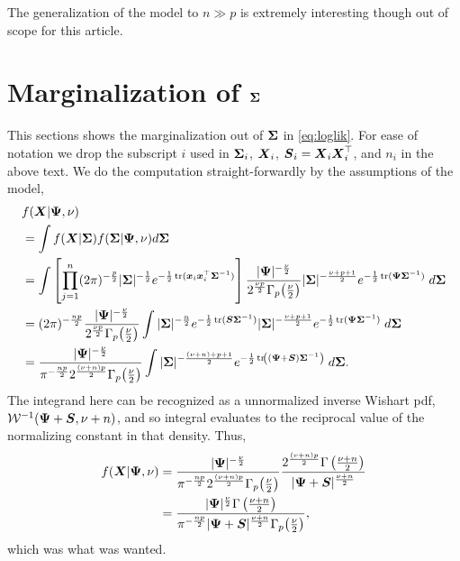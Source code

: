 \documentclass{article}\usepackage[]{graphicx}\usepackage[]{color}
\begin{document}
The generalization of the model to $n \gg p$ is extremely interesting though out of scope for this article.



\newpage




\newpage
\appendix

\section[Marginalization of Sigma]{Marginalization of ${\boldsymbol{\Sigma}}$}
\label{sec:marginalization}
This sections shows the marginalization out of ${\boldsymbol{\Sigma}}$ in \eqref{eq:loglik}. For ease of notation we drop the subscript $i$ used in ${\boldsymbol{\Sigma}}_i$, ${\boldsymbol{X}}_i$, ${\boldsymbol{S}}_i = {\boldsymbol{X}}_i {\boldsymbol{X}}_i^\top$, and $n_i$ in the above text. We do the computation straight-forwardly by the assumptions of the model,
\small
\begin{align*}
  &f({\boldsymbol{X}} | {\boldsymbol{\Psi}}, \nu) \\
  &= \int f({\boldsymbol{X}}|{\boldsymbol{\Sigma}}) f({\boldsymbol{\Sigma}} | {\boldsymbol{\Psi}}, \nu) d{\boldsymbol{\Sigma}} \\
  &= \int \left[ \prod_{j = 1}^n  (2\pi)^{-\frac{p}{2}} |{\boldsymbol{\Sigma}}|^{-\frac{1}{2}}
                         e^{-\frac{1}{2}\operatorname*{tr}({\boldsymbol{x}}_i{\boldsymbol{x}}_i^\top{\boldsymbol{\Sigma}}^{-1})} \right]
          \frac{|{\boldsymbol{\Psi}}|^{-\frac{\nu}{2}}}{2^{\frac{\nu p}{2}}\Gamma_p\!\left(\frac{\nu}{2}\right)}
          |{\boldsymbol{\Sigma}}|^{-\frac{\nu+p+1}{2}}e^{-\frac{1}{2}\operatorname*{tr}({\boldsymbol{\Psi}}{\boldsymbol{\Sigma}}^{-1})}
      \;d{\boldsymbol{\Sigma}} \\
  &= (2\pi)^{-\frac{np}{2}}
      \frac{|{\boldsymbol{\Psi}}|^{-\frac{\nu}{2}}}{2^{\frac{\nu p}{2}}\Gamma_p\!\left(\frac{\nu}{2}\right)}
      \int
        |{\boldsymbol{\Sigma}}|^{-\frac{n}{2}}  e^{-\frac{1}{2}\operatorname*{tr}({\boldsymbol{S}}{\boldsymbol{\Sigma}}^{-1})}
        |{\boldsymbol{\Sigma}}|^{-\frac{\nu+p+1}{2}} e^{-\frac{1}{2}\operatorname*{tr}({\boldsymbol{\Psi}}{\boldsymbol{\Sigma}}^{-1})}
      \;d{\boldsymbol{\Sigma}} \\
  &=
      \frac{|{\boldsymbol{\Psi}}|^{-\frac{\nu}{2}}}{\pi^{-\frac{np}{2}}2^{\frac{(\nu + n) p}{2}}\Gamma_p\!\left(\frac{\nu}{2}\right)}
      \int
        |{\boldsymbol{\Sigma}}|^{-\frac{(\nu + n)+p+1}{2}}
         e^{-\frac{1}{2}\operatorname*{tr}\!\left(({\boldsymbol{\Psi}}+ {\boldsymbol{S}}){\boldsymbol{\Sigma}}^{-1}\right)}
      \;d{\boldsymbol{\Sigma}}.
\end{align*}
\normalsize
The integrand here can be recognized as a unnormalized inverse Wishart pdf,  $\mathcal{W}^{-1}({\boldsymbol{\Psi}} + {\boldsymbol{S}}, \nu + n)$, and so integral evaluates to the reciprocal value of the normalizing constant in that density. Thus,
\begin{align*}
  f({\boldsymbol{X}} | {\boldsymbol{\Psi}}, \nu)
  &=
    \frac{|{\boldsymbol{\Psi}}|^{-\frac{\nu}{2}}}
         {\pi^{-\frac{np}{2}} 2^{\frac{(\nu + n) p}{2} } \Gamma_p\!\left(\frac{\nu}{2}\right)}
    \frac{2^\frac{(v+n)p}{2} \Gamma\left(\frac{\nu + n}{2}\right)}
         {|{\boldsymbol{\Psi}} + {\boldsymbol{S}}|^{\frac{\nu + n}{2}}} \\
  &=
    \frac{|{\boldsymbol{\Psi}}|^\frac{\nu}{2} \Gamma\left(\frac{\nu + n}{2}\right)}
         {\pi^{-\frac{np}{2}} |{\boldsymbol{\Psi}} + {\boldsymbol{S}}|^{\frac{\nu + n}{2}}\Gamma_p\!\left(\frac{\nu}{2}\right)},
\end{align*}
which was what was wanted.
\end{document}

